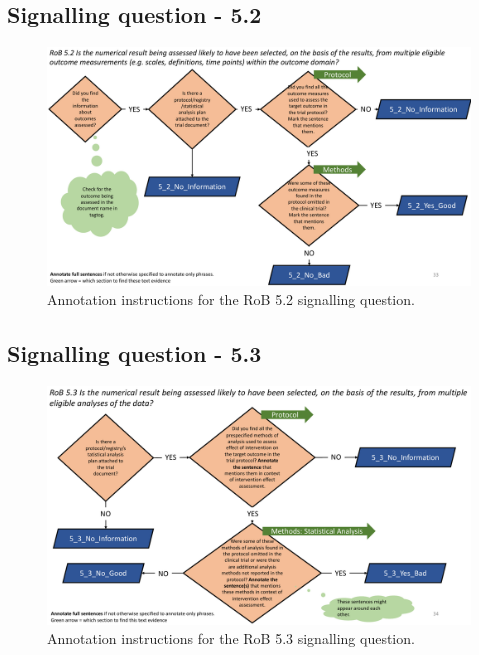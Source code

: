 \documentclass[sn-mathphys,Numbered]{sn-jnl}%
\begin{document}
\subsection*{Signalling question - 5.2 }
%
\begin{figure}[htbp]
    \centering
    \includegraphics[width=\textwidth]{figures/5_2.pdf}
    \caption{Annotation instructions for the RoB 5.2 signalling question.}
    \label{fig:5_2}
\end{figure}
%
%
%
\subsection*{Signalling question - 5.3 }
%
\begin{figure}[htbp]
    \centering
    \includegraphics[width=\textwidth]{figures/5_3.pdf}
    \caption{Annotation instructions for the RoB 5.3 signalling question.}
    \label{fig:5_3}
\end{figure}
%
%
%
\clearpage
%
\end{document}
